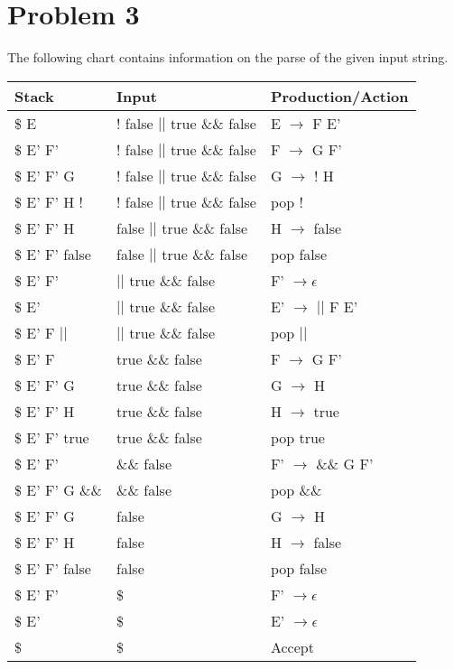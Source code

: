 \documentclass{article}
\providecommand{\prob}[1]{\section*{Problem #1}}
\begin{document}
    \pagebreak
    \prob{3}
    The following chart contains information on the parse of the given input string.
    \begin{center}
        \begin{tabular}{l|l|l}
            \textbf{Stack} & \textbf{Input} & \textbf{Production/Action} \\ \hline
            \$ E            & ! false $||$ true \&\& false & E $\to$ F E'      \\
            \$ E' F'        & ! false $||$ true \&\& false & F $\to$ G F'      \\
            \$ E' F' G      & ! false $||$ true \&\& false & G $\to$ ! H       \\
            \$ E' F' H !    & ! false $||$ true \&\& false & pop !             \\
            \$ E' F' H      & false $||$ true \&\& false   & H $\to$ false     \\
            \$ E' F' false  & false $||$ true \&\& false   & pop false         \\
            \$ E' F'        & $||$ true \&\& false         & F' $\to \epsilon$ \\
            \$ E'           & $||$ true \&\& false         & E' $\to$ $||$ F E'\\
            \$ E' F $||$    & $||$ true \&\& false         & pop $||$          \\
            \$ E' F         & true \&\& false              & F $\to$ G F'      \\
            \$ E' F' G      & true \&\& false              & G $\to$ H         \\
            \$ E' F' H      & true \&\& false              & H $\to$ true      \\
            \$ E' F' true   & true \&\& false              & pop true          \\
            \$ E' F'        & \&\& false                   & F' $\to$ \&\& G F'\\
            \$ E' F' G \&\& & \&\& false                   & pop \&\&          \\
            \$ E' F' G      & false                        & G $\to$ H         \\
            \$ E' F' H      & false                        & H $\to$ false     \\
            \$ E' F' false  & false                        & pop false         \\
            \$ E' F'        & \$                           & F' $\to \epsilon$ \\
            \$ E'           & \$                           & E' $\to \epsilon$ \\
            \$              & \$                           & Accept            \\
        \end{tabular}
    \end{center}
\end{document}
